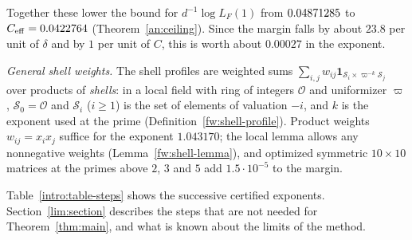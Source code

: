 Together these lower the bound for $d^{-1}\log L_F(1)$ from $0.04871285$ to
$C_{\rm eff}=0.0422764$ (Theorem~\ref{an:ceiling}). Since the margin falls by
about $23.8$ per unit of $\delta$ and by $1$ per unit of $C$, this is
worth about $0.00027$ in the exponent.

\emph{General shell weights.} The shell profiles are weighted sums $\sum_{i,j}w_{ij}\mathbf 1_{\mathcal S_i\times
\varpi^{-k}\mathcal S_j}$ over products of \emph{shells}: in a local field
with ring of integers $\mathcal O$ and uniformizer $\varpi$,
$\mathcal S_0=\mathcal O$ and $\mathcal S_i$ ($i\ge1$) is the set of elements
of valuation $-i$, and $k$ is the exponent used at the prime
(Definition~\ref{fw:shell-profile}). Product weights $w_{ij}=x_ix_j$
suffice for the exponent $1.043170$; the local lemma allows any
nonnegative weights (Lemma~\ref{fw:shell-lemma}), and optimized symmetric
$10\times10$ matrices at the primes above $2$, $3$ and $5$ add
$1.5\cdot10^{-5}$ to the margin.

Table~\ref{intro:table-steps} shows the successive certified exponents.
Section~\ref{lim:section} describes the steps that are not needed for
Theorem~\ref{thm:main}, and what is known about the limits of the
method.

